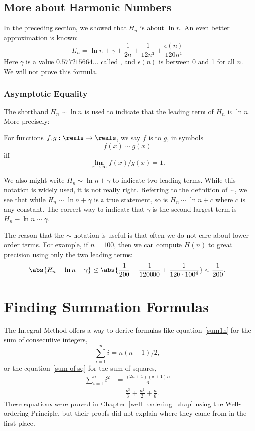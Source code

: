 \subsection{More about Harmonic Numbers}

In the preceding section, we showed that $H_n$ is about $\ln n$.  An
even better approximation is known:
\[
H_n = \ln n + \gamma + \frac{1}{2n} + \frac{1}{12n^2} +
        \frac{\epsilon(n)}{120n^4}
\]
Here $\gamma$ is a value $0.577215664\dots$ called , and $\epsilon(n)$ is between 0 and 1 for all $n$.  We will
not prove this formula.

\subsubsection{Asymptotic Equality}
The shorthand $H_n \sim \ln n$ is used to indicate that the leading
term of $H_n$ is $\ln n$.  More precisely:
\begin{definition}\label{def:sim}
For functions $f,g: \reals \to \reals$, we say $f$ is  to $g$, in symbols,
\[
f(x) \sim g(x)
\]
iff
\[
\lim_{x \rightarrow \infty} f(x)/g(x) = 1.
\]
\end{definition}

We also might write $H_n \sim \ln n + \gamma$ to indicate two leading
terms.  While this notation is widely used, it is not really right.
Referring to the definition of $\sim$, we see that while $H_n \sim \ln
n + \gamma$ is a true statement, so is $H_n \sim \ln n + c$ where $c$
is any constant.  The correct way to indicate that $\gamma$ is the
second-largest term is $H_n - \ln n \sim \gamma$.

The reason that the $\sim$ notation is
useful is that often we do not care about lower order terms.  For example,
if $n = 100$, then we can compute $H(n)$ to great precision using only the
two leading terms:
\[
\abs{H_n - \ln n - \gamma} \leq \abs{\frac{1}{200} - \frac{1}{120000} +
\frac{1}{120 \cdot 100^4}} < \frac{1}{200}.
\]

\section{Finding Summation Formulas}\label{findsum_sec}

The Integral Method offers a way to derive formulas like
equation~\eqref{sum1n} for the sum of consecutive integers,
\[
\sum_{i=1}^n i = n(n+1)/2,
\]
or the equation~\eqref{sum-of-sq} for the sum of squares,
\begin{align*}
\sum_{i=1}^n i^2 & =  \frac{(2n+1)(n+1)n}{6} \\
                 & =  \frac{n^3}{3} + \frac{n^2}{2} + \frac{n}{6}.
\end{align*}
These equations were proved in Chapter~\ref{well_ordering_chap} using the
Well-ordering Principle, but their proofs did not explain where they came
from in the first place.

